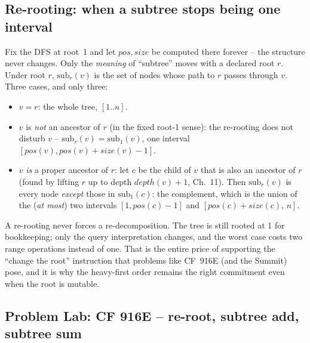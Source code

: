 \subsection{Re-rooting: when a subtree stops being one interval}

Fix the DFS at root~1 and let \(\mathit{pos},\mathit{size}\) be computed there forever -- the structure never changes. Only the \emph{meaning} of ``subtree'' moves with a declared root \(r\). Under root \(r\), \(\mathrm{sub}_r(v)\) is the set of nodes whose path to \(r\) passes through \(v\). Three cases, and only three:

\begin{itemize}[nosep,leftmargin=1.4em]
  \item \(v=r\): the whole tree, \([1..n]\).
  \item \(v\) is \emph{not} an ancestor of \(r\) (in the fixed root-1 sense): the re-rooting does not disturb \(v\) -- \(\mathrm{sub}_r(v)=\mathrm{sub}_1(v)\), one interval \([\mathit{pos}(v),\mathit{pos}(v)+\mathit{size}(v)-1]\).
  \item \(v\) \emph{is} a proper ancestor of \(r\): let \(c\) be the child of \(v\) that is also an ancestor of \(r\) (found by lifting \(r\) up to depth \(\mathit{depth}(v)+1\), Ch.~11). Then \(\mathrm{sub}_r(v)\) is every node \emph{except} those in \(\mathrm{sub}_1(c)\): the complement, which is the union of the (\emph{at most}) two intervals \([1,\mathit{pos}(c)-1]\) and \([\mathit{pos}(c)+\mathit{size}(c),\,n]\).
\end{itemize}

\begin{insightbox}
A re-rooting never forces a re-decomposition. The tree is still rooted at 1 for bookkeeping; only the query interpretation changes, and the worst case costs two range operations instead of one. That is the entire price of supporting the ``change the root'' instruction that problems like CF~916E (and the Summit) pose, and it is why the heavy-first order remains the right commitment even when the root is mutable.
\end{insightbox}

\subsection{Problem Lab: CF 916E -- re-root, subtree add, subtree sum}

